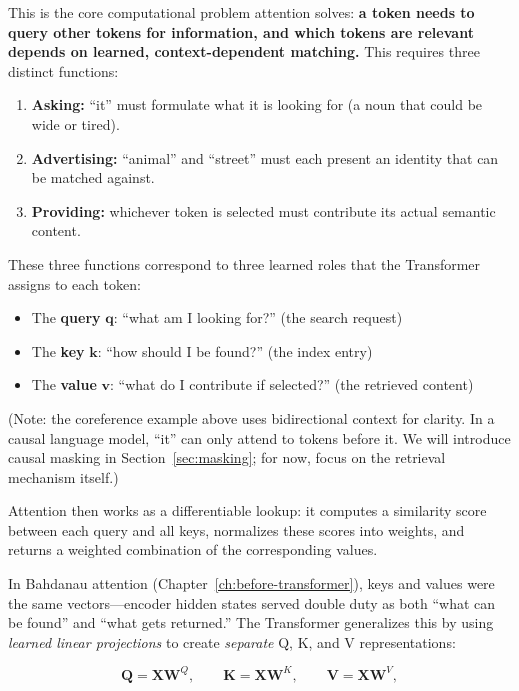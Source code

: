 This is the core computational problem attention solves: \textbf{a token needs to query other tokens for information, and which tokens are relevant depends on learned, context-dependent matching.} This requires three distinct functions:

\begin{enumerate}[nosep]
    \item \textbf{Asking:} ``it'' must formulate what it is looking for (a noun that could be wide or tired).
    \item \textbf{Advertising:} ``animal'' and ``street'' must each present an identity that can be matched against.
    \item \textbf{Providing:} whichever token is selected must contribute its actual semantic content.
\end{enumerate}

These three functions correspond to three learned roles that the Transformer assigns to each token:

\begin{itemize}
    \item The \textbf{query} $\mathbf{q}$: ``what am I looking for?'' (the search request)
    \item The \textbf{key} $\mathbf{k}$: ``how should I be found?'' (the index entry)
    \item The \textbf{value} $\mathbf{v}$: ``what do I contribute if selected?'' (the retrieved content)
\end{itemize}

(Note: the coreference example above uses bidirectional context for clarity. In a causal language model, ``it'' can only attend to tokens before it. We will introduce causal masking in Section~\ref{sec:masking}; for now, focus on the retrieval mechanism itself.)

Attention then works as a differentiable lookup: it computes a similarity score between each query and all keys, normalizes these scores into weights, and returns a weighted combination of the corresponding values.

In Bahdanau attention (Chapter~\ref{ch:before-transformer}), keys and values were the same vectors---encoder hidden states served double duty as both ``what can be found'' and ``what gets returned.'' The Transformer generalizes this by using \emph{learned linear projections} to create \emph{separate} Q, K, and V representations:

\[
\mathbf{Q} = \mathbf{X}\mathbf{W}^Q, \qquad
\mathbf{K} = \mathbf{X}\mathbf{W}^K, \qquad
\mathbf{V} = \mathbf{X}\mathbf{W}^V,
\]

